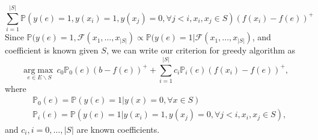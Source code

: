 \documentclass[11pt]{article}
\newcommand{\E}{\mathbb{E}}
\begin{document}
\begin{equation*}
\sum_{i=1}^{|S|} \mathbb{P}(y(e)=1, y(x_i)=1, y(x_j)=0, \forall j<i, x_i,x_j \in S)(f(x_i)-f(e))^+
\end{equation*}
Since $\mathbb{P}(y(e)=1, \mathcal{F}(x_1,\ldots,x_{|S|}) \propto \mathbb{P}(y(e)=1| \mathcal{F}(x_1,\ldots,x_{|S|})$, and coefficient is known given $S$, we can write our criterion for greedy algorithm as
\begin{equation} \label{eq:EI3}
\underset{e \in E \backslash S}{\mathrm{arg}\max} \, c_0 \mathbb{P}_0(e)(b-f(e))^+ + \sum_{i=1}^{|S|} c_i \mathbb{P}_i(e)(f(x_i)-f(e))^+,
\end{equation}
where
\begin{align*}
&\mathbb{P}_0(e)=\mathbb{P}(y(e)=1|y(x)=0, \forall x \in S)\\
&\mathbb{P}_i(e)=\mathbb{P}(y(e)=1|y(x_i)=1, y(x_j)=0, \forall j<i, x_i,x_j \in S),
\end{align*}
and $c_i, i=0,\ldots,|S|$ are known coefficients.

\end{document}
